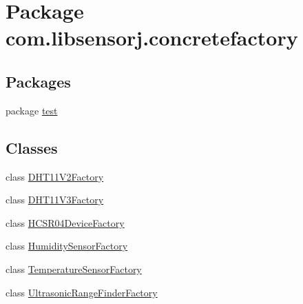 \hypertarget{namespacecom_1_1libsensorj_1_1concretefactory}{}\section{Package com.\+libsensorj.\+concretefactory}
\label{namespacecom_1_1libsensorj_1_1concretefactory}
\subsection*{Packages}
\begin{DoxyCompactItemize}
\item 
package \hyperlink{namespacecom_1_1libsensorj_1_1concretefactory_1_1test}{test}
\end{DoxyCompactItemize}
\subsection*{Classes}
\begin{DoxyCompactItemize}
\item 
class \hyperlink{classcom_1_1libsensorj_1_1concretefactory_1_1DHT11V2Factory}{D\+H\+T11\+V2\+Factory}
\item 
class \hyperlink{classcom_1_1libsensorj_1_1concretefactory_1_1DHT11V3Factory}{D\+H\+T11\+V3\+Factory}
\item 
class \hyperlink{classcom_1_1libsensorj_1_1concretefactory_1_1HCSR04DeviceFactory}{H\+C\+S\+R04\+Device\+Factory}
\item 
class \hyperlink{classcom_1_1libsensorj_1_1concretefactory_1_1HumiditySensorFactory}{Humidity\+Sensor\+Factory}
\item 
class \hyperlink{classcom_1_1libsensorj_1_1concretefactory_1_1TemperatureSensorFactory}{Temperature\+Sensor\+Factory}
\item 
class \hyperlink{classcom_1_1libsensorj_1_1concretefactory_1_1UltrasonicRangeFinderFactory}{Ultrasonic\+Range\+Finder\+Factory}
\end{DoxyCompactItemize}
